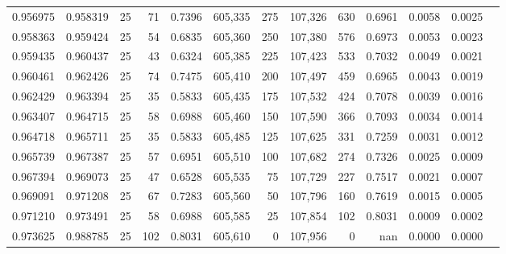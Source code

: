 \begin{tabular}{rrrrrrrrrrrrr}
0.956975 & 0.958319 &    25 &  71 &                                     0.7396 & 605,335 &     275 & 107,326 &     630 & 0.6961 & 0.0058 & 0.0025 \\
0.958363 & 0.959424 &    25 &  54 &                                     0.6835 & 605,360 &     250 & 107,380 &     576 & 0.6973 & 0.0053 & 0.0023 \\
0.959435 & 0.960437 &    25 &  43 &                                     0.6324 & 605,385 &     225 & 107,423 &     533 & 0.7032 & 0.0049 & 0.0021 \\
0.960461 & 0.962426 &    25 &  74 &                                     0.7475 & 605,410 &     200 & 107,497 &     459 & 0.6965 & 0.0043 & 0.0019 \\
0.962429 & 0.963394 &    25 &  35 &                                     0.5833 & 605,435 &     175 & 107,532 &     424 & 0.7078 & 0.0039 & 0.0016 \\
0.963407 & 0.964715 &    25 &  58 &                                     0.6988 & 605,460 &     150 & 107,590 &     366 & 0.7093 & 0.0034 & 0.0014 \\
0.964718 & 0.965711 &    25 &  35 &                                     0.5833 & 605,485 &     125 & 107,625 &     331 & 0.7259 & 0.0031 & 0.0012 \\
0.965739 & 0.967387 &    25 &  57 &                                     0.6951 & 605,510 &     100 & 107,682 &     274 & 0.7326 & 0.0025 & 0.0009 \\
0.967394 & 0.969073 &    25 &  47 &                                     0.6528 & 605,535 &      75 & 107,729 &     227 & 0.7517 & 0.0021 & 0.0007 \\
0.969091 & 0.971208 &    25 &  67 &                                     0.7283 & 605,560 &      50 & 107,796 &     160 & 0.7619 & 0.0015 & 0.0005 \\
0.971210 & 0.973491 &    25 &  58 &                                     0.6988 & 605,585 &      25 & 107,854 &     102 & 0.8031 & 0.0009 & 0.0002 \\
0.973625 & 0.988785 &    25 & 102 &                                     0.8031 & 605,610 &       0 & 107,956 &       0 &    nan & 0.0000 & 0.0000 \\
\bottomrule
\end{tabular}
